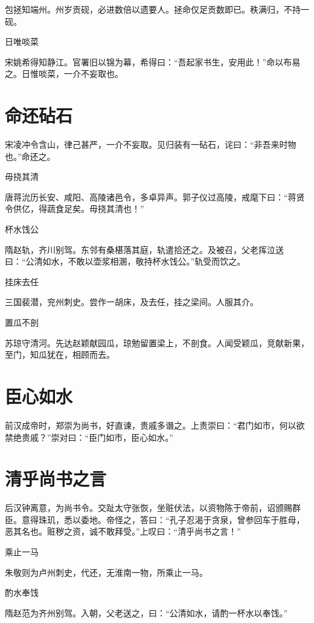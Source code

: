 \documentclass[a4paper,12pt,UTF8,twoside]{ctexbook}
\begin{document}
    包拯知端州。州岁贡砚，必进数倍以遗要人。拯命仅足贡数即已。秩满归，不持一砚。
    
    日唯啖菜
    
    宋姚希得知静江。官署旧以锦为幕，希得曰：“吾起家书生，安用此！”命以布易之。日惟啖菜，一介不妄取也。
    
    \section{命还砧石}
    
    宋凌冲令含山，律己甚严，一介不妄取。见归装有一砧石，诧曰：“非吾来时物也。”命还之。
    
    毋挠其清
    
    唐蒋沇历长安、咸阳、高陵诸邑令，多卓异声。郭子仪过高陵，戒麾下曰：“蒋贤令供亿，得蔬食足矣。毋挠其清也！”
    
    杯水饯公
    
    隋赵轨，齐川别驾。东邻有桑椹落其庭，轨遣拾还之。及被召，父老挥泣送曰：“公清如水，不敢以壶浆相溷，敬持杯水饯公。”轨受而饮之。
    
    挂床去任
    
    三国裴潜，兖州刺史。尝作一胡床，及去任，挂之梁间。人服其介。
    
    置瓜不剖
    
    苏琼守清河。先达赵颖献园瓜，琼勉留置梁上，不剖食。人闻受颖瓜，竞献新果，至门，知瓜犹在，相顾而去。
    \section{臣心如水}
    
    前汉成帝时，郑崇为尚书，好直谏，贵戚多谮之。上责崇曰：“君门如市，何以欲禁绝贵戚？”崇对曰：“臣门如市，臣心如水。”
    
    \section{清乎尚书之言}
    
    后汉钟离意，为尚书令。交趾太守张恢，坐赃伏法，以资物陈于帝前，诏颁赐群臣。意得珠玑，悉以委地。帝怪之，答曰：“孔子忍渴于贪泉，曾参回车于胜母，恶其名也。赃秽之资，诚不敢拜受。”上叹曰：“清乎尚书之言！”
    
    乘止一马
    
    朱敬则为卢州刺史，代还，无淮南一物，所乘止一马。
    
    酌水奉饯
    
    隋赵范为齐州别驾。入朝，父老送之，曰：“公清如水，请酌一杯水以奉饯。”
    
\end{document}
